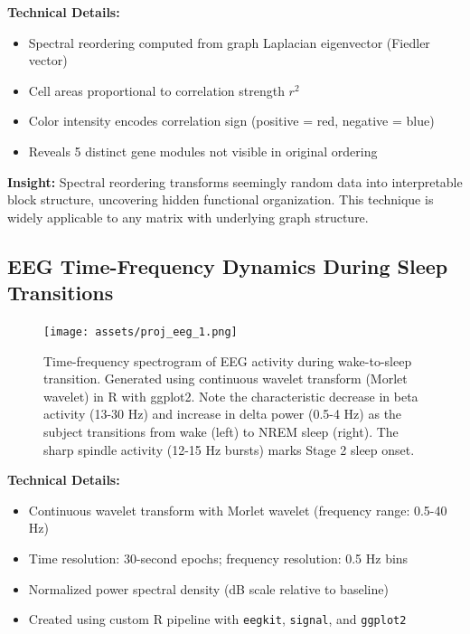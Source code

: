 \textbf{Technical Details:}
\begin{itemize}[leftmargin=1.2em, itemsep=0.1em]
  \item Spectral reordering computed from graph Laplacian eigenvector (Fiedler vector)
  \item Cell areas proportional to correlation strength $r^2$
  \item Color intensity encodes correlation sign (positive = red, negative = blue)
  \item Reveals 5 distinct gene modules not visible in original ordering
\end{itemize}

\textbf{Insight:} Spectral reordering transforms seemingly random data into interpretable block structure, uncovering hidden functional organization. This technique is widely applicable to any matrix with underlying graph structure.

\vspace{2em}


\subsection*{EEG Time-Frequency Dynamics During Sleep Transitions}

\begin{figure}[h]
\centering
\texttt{[image: assets/proj\_eeg\_1.png]}
\caption{Time-frequency spectrogram of EEG activity during wake-to-sleep transition. Generated using continuous wavelet transform (Morlet wavelet) in R with ggplot2. Note the characteristic decrease in beta activity (13-30 Hz) and increase in delta power (0.5-4 Hz) as the subject transitions from wake (left) to NREM sleep (right). The sharp spindle activity (12-15 Hz bursts) marks Stage 2 sleep onset.}
\end{figure}

\textbf{Technical Details:}
\begin{itemize}[leftmargin=1.2em, itemsep=0.1em]
  \item Continuous wavelet transform with Morlet wavelet (frequency range: 0.5-40 Hz)
  \item Time resolution: 30-second epochs; frequency resolution: 0.5 Hz bins
  \item Normalized power spectral density (dB scale relative to baseline)
  \item Created using custom R pipeline with \texttt{eegkit}, \texttt{signal}, and \texttt{ggplot2}
\end{itemize}

